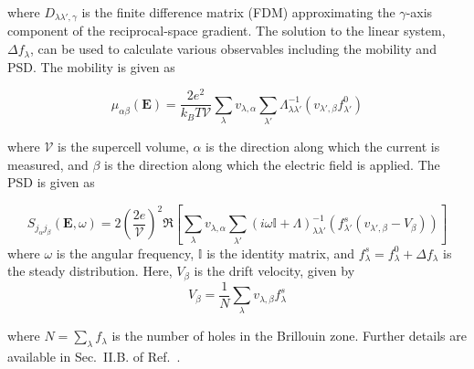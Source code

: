 \documentclass[aps,prx,preprint,letterpaper,groupedaddress,longbibliography]{revtex4-2}
\theoremstyle{definition}
\newcommand{\qnumber}{\lambda}
\newcommand{\qnumberp}{\lambda'}
\begin{document}
\noindent where $D_{\qnumber\qnumberp,\gamma}$ is the finite difference matrix (FDM) approximating the $\gamma$-axis component of the reciprocal-space gradient. The solution to the linear system, $\Delta f_{\qnumber}$, can be used to calculate  various observables including the mobility and PSD. The mobility is given as \cite{Li:2015}

\begin{equation}
    {
        \mu_{\alpha\beta}(\mathbf{E})
        =
        \frac{2e^2}{k_BT\mathcal{V}}
        \sum_{\qnumber}
        v_{\qnumber,\alpha}
        \sum_{\qnumberp}
        \Lambda^{-1}_{\qnumber\qnumberp}
        \left(
            v_{\qnumberp,\beta}
            f^0_{\qnumberp}
        \right)
    }
    \label{mobility}
\end{equation} 

\noindent where $\mathcal{V}$ is the supercell volume, $\alpha$ is the direction along which the current is measured, and $\beta$ is the direction along which the electric field is applied. The PSD is given as

\begin{equation}
    {
        S_{j_\alpha j_\beta}(\mathbf{E},\omega)
        =
        2\left(
            \frac{2e}{\mathcal{V}}
        \right)^2
        \mathfrak{R}
        \left[
            \sum_{\qnumber}
            v_{\qnumber,\alpha}
            \sum_{\qnumberp}
            \left(
                i\omega\mathbb{I}
                +\Lambda
            \right)_{\qnumber\qnumberp}^{-1}
            \left(
                f^s_{\qnumberp}
                \left(
                    v_{\qnumberp,\beta}
                    -V_\beta
                \right)
            \right)
        \right]
    }
    \label{vPSD}
\end{equation}
\noindent where $\omega$ is the angular frequency, $\mathbb{I}$ is the identity matrix, and  $f^s_{\qnumber}=f^0_{\qnumber}+\Delta f_{\qnumber}$ is the steady distribution. Here, $V_\beta$ is the drift velocity, given by
\begin{equation}
    {
        V_\beta
        =
        \frac{1}{N}
        \sum_{\qnumber}
        v_{\qnumber,\beta}
        f^s_{\qnumber}
    }
    \label{aveV}
\end{equation}

\noindent where $N=\sum_{\qnumber}f_{\qnumber}$ is the number of holes in the Brillouin zone. Further details are available in Sec.~II.B. of Ref.~\cite{Choi:2021}.
\end{document}
